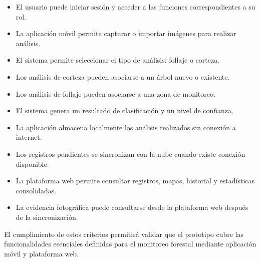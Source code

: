 \begin{itemize}
    \item El usuario puede iniciar sesión y acceder a las funciones correspondientes a su rol.
    \item La aplicación móvil permite capturar o importar imágenes para realizar análisis.
    \item El sistema permite seleccionar el tipo de análisis: follaje o corteza.
    \item Los análisis de corteza pueden asociarse a un árbol nuevo o existente.
    \item Los análisis de follaje pueden asociarse a una zona de monitoreo.
    \item El sistema genera un resultado de clasificación y un nivel de confianza.
    \item La aplicación almacena localmente los análisis realizados sin conexión a internet.
    \item Los registros pendientes se sincronizan con la nube cuando existe conexión disponible.
    \item La plataforma web permite consultar registros, mapas, historial y estadísticas consolidadas.
    \item La evidencia fotográfica puede consultarse desde la plataforma web después de la sincronización.
\end{itemize}

El cumplimiento de estos criterios permitirá validar que el prototipo cubre las funcionalidades esenciales definidas para el monitoreo forestal mediante aplicación móvil y plataforma web.